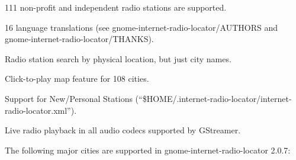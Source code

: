 \documentclass[20pt,landscape]{foils}
\begin{document}

\begin{list1}
\item 111 non-profit and independent radio stations are supported.
\item 16 language translations (see gnome-internet-radio-locator/AUTHORS and gnome-internet-radio-locator/THANKS).
\item Radio station search by physical location, but just city names.
\item Click-to-play map feature for 108 cities.
\item Support for New/Personal Stations (``\$HOME/.internet-radio-locator/internet-radio-locator.xml'').
\item Live radio playback in all audio codecs supported by GStreamer.
\end{list1}


The following major cities are supported in gnome-internet-radio-locator 2.0.7:
\end{document}
